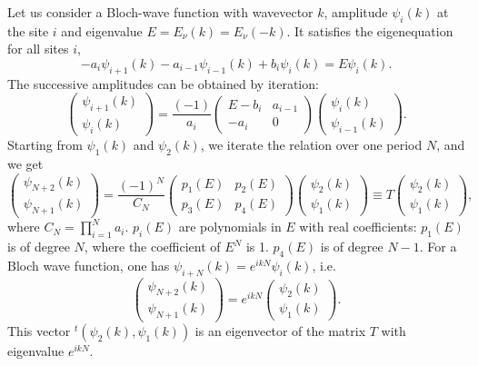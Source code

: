 \documentclass[]{revtex4-1}
\begin{document}
Let us consider a Bloch-wave function with wavevector $k$, amplitude $\psi_{i}(k)$ at the site $i$ and eigenvalue $E=E_{\nu}(k)=E_{\nu}(-k)$. It satisfies the eigenequation for all sites $i$,
\begin{equation}
-a_i \psi_{i+1}(k)-a_{i-1} \psi_{i-1}(k)+b_i \psi_{i}(k) = E \psi_{i}(k).
\end{equation}
The successive amplitudes can be obtained by iteration:
\begin{equation}
\begin{pmatrix} \psi_{i+1}(k) \\ \psi_{i}(k) \end{pmatrix} = \frac{(-1)}{a_i} \begin{pmatrix}
    E-b_i & a_{i-1}  \\
    -a_i & 0 
  \end{pmatrix} \begin{pmatrix} \psi_{i}(k) \\ \psi_{i-1}(k) \end{pmatrix}.
  \end{equation}
Starting from $\psi_{1}(k)$ and $\psi_{2}(k)$, we iterate the relation over one period $N$, and we get
\begin{equation}
\begin{pmatrix} \psi_{N+2}(k) \\ \psi_{N+1}(k) \end{pmatrix} = \frac{(-1)^N}{C_N} \begin{pmatrix} p_1(E) & p_2(E) \\ p_3(E) & p_4(E) \end{pmatrix} \begin{pmatrix} \psi_{2}(k) \\ \psi_{1}(k) \end{pmatrix}  \equiv T \begin{pmatrix} \psi_{2}(k) \\ \psi_{1}(k) \end{pmatrix},
\end{equation}
where $C_N=\prod_{i=1}^N a_i$. $p_i(E)$ are polynomials in $E$ with real coefficients: $p_1(E)$ is of degree $N$, where the coefficient of $E^N$ is 1. $p_4(E)$ is of degree $N-1$. For a Bloch wave function, one has $\psi_{i+N}(k)=e^{ikN} \psi_{i}(k)$, i.e.
\begin{equation}
\begin{pmatrix} \psi_{N+2}(k) \\ \psi_{N+1}(k) \end{pmatrix} = e^{ikN} \begin{pmatrix} \psi_{2}(k) \\ \psi_{1}(k) \end{pmatrix}.
\end{equation}
This vector $^t\left(\psi_{2}(k),\psi_{1}(k)\right)$ is an eigenvector of the matrix $T$ with eigenvalue $e^{ikN}$.
\end{document}
